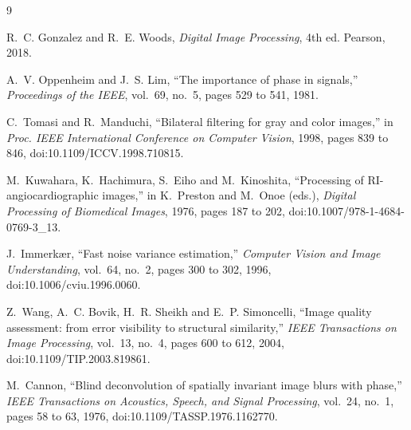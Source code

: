 \begin{thebibliography}{9}

R.~C. Gonzalez and R.~E. Woods, \emph{Digital Image Processing}, 4th ed.
Pearson, 2018.

A.~V. Oppenheim and J.~S. Lim, ``The importance of phase in signals,''
\emph{Proceedings of the IEEE}, vol.~69, no.~5, pages 529 to 541, 1981.

C.~Tomasi and R.~Manduchi, ``Bilateral filtering for gray and color images,'' in
\emph{Proc. IEEE International Conference on Computer Vision}, 1998,
pages 839 to 846, doi:10.1109/ICCV.1998.710815.

M.~Kuwahara, K.~Hachimura, S.~Eiho and M.~Kinoshita, ``Processing of
RI-angiocardiographic images,'' in K.~Preston and M.~Onoe (eds.), \emph{Digital
Processing of Biomedical Images}, 1976, pages 187 to 202,
doi:10.1007/978-1-4684-0769-3\_13.

J.~Immerkær, ``Fast noise variance estimation,'' \emph{Computer Vision and Image
Understanding}, vol.~64, no.~2, pages 300 to 302, 1996, doi:10.1006/cviu.1996.0060.

Z.~Wang, A.~C. Bovik, H.~R. Sheikh and E.~P. Simoncelli, ``Image quality
assessment: from error visibility to structural similarity,'' \emph{IEEE
Transactions on Image Processing}, vol.~13, no.~4, pages 600 to 612, 2004,
doi:10.1109/TIP.2003.819861.

M.~Cannon, ``Blind deconvolution of spatially invariant image blurs with phase,''
\emph{IEEE Transactions on Acoustics, Speech, and Signal Processing}, vol.~24,
no.~1, pages 58 to 63, 1976, doi:10.1109/TASSP.1976.1162770.

\end{thebibliography}
